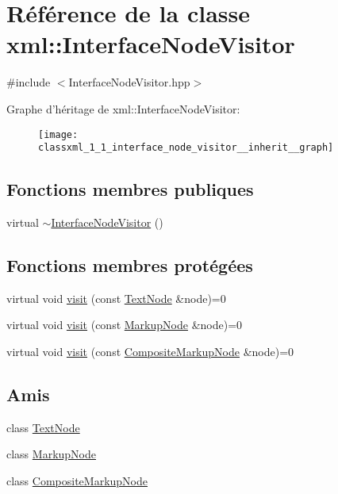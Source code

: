 \hypertarget{classxml_1_1_interface_node_visitor}{
\section{Référence de la classe xml::InterfaceNodeVisitor}
\label{classxml_1_1_interface_node_visitor}
}


{\ttfamily \#include $<$InterfaceNodeVisitor.hpp$>$}



Graphe d'héritage de xml::InterfaceNodeVisitor:\nopagebreak
\begin{figure}[H]
\begin{center}
\leavevmode
\texttt{[image: classxml\_1\_1\_interface\_node\_visitor\_\_inherit\_\_graph]}
\end{center}
\end{figure}
\subsection*{Fonctions membres publiques}
\begin{DoxyCompactItemize}
\item 
virtual \hyperlink{classxml_1_1_interface_node_visitor_a53c5fa9a736af1450bbc3d95feffe94a}{$\sim$InterfaceNodeVisitor} ()
\end{DoxyCompactItemize}
\subsection*{Fonctions membres protégées}
\begin{DoxyCompactItemize}
\item 
virtual void \hyperlink{classxml_1_1_interface_node_visitor_a22a8a333e5cf2da1f1ac9f8f1f376a89}{visit} (const \hyperlink{classxml_1_1_text_node}{TextNode} \&node)=0
\item 
virtual void \hyperlink{classxml_1_1_interface_node_visitor_a53b33aabb8a79d4b1715c7664671d326}{visit} (const \hyperlink{classxml_1_1_markup_node}{MarkupNode} \&node)=0
\item 
virtual void \hyperlink{classxml_1_1_interface_node_visitor_afd6306ffd03380f21f436234b314c34d}{visit} (const \hyperlink{classxml_1_1_composite_markup_node}{CompositeMarkupNode} \&node)=0
\end{DoxyCompactItemize}
\subsection*{Amis}
\begin{DoxyCompactItemize}
\item 
class \hyperlink{classxml_1_1_interface_node_visitor_abd4faab11b504920cd6f8af02104143c}{TextNode}
\item 
class \hyperlink{classxml_1_1_interface_node_visitor_ac2a462e7a005c065f6778ccc0be88931}{MarkupNode}
\item 
class \hyperlink{classxml_1_1_interface_node_visitor_a8478dddac071858d6a22088eb161a690}{CompositeMarkupNode}
\end{DoxyCompactItemize}


